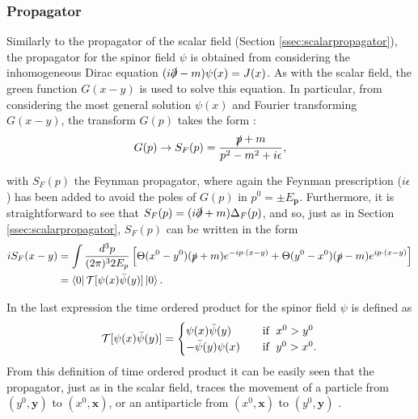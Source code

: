 \subsubsection{Propagator}

Similarly to the propagator of the scalar field (Section \ref{ssec:scalarpropagator}), the propagator for the spinor field $\psi$ is obtained from considering the inhomogeneous Dirac equation $(i\slashed{\partial} - m)\psi(x) = J(x)$. As with the scalar field, the green function $G(x - y)$ is used to solve this equation. In particular, from considering the most general solution $\psi(x)$ and Fourier transforming $G(x - y)$, the transform $G(p)$ takes the form \cite{Lahiri}:
\begin{equation*}
    G(p) \rightarrow S_F(p) = \dfrac{\slashed{p} + m}{p^2 - m^2 + i\epsilon},
\end{equation*}

with $S_F(p)$ the Feynman propagator, where again the Feynman prescription ($i\epsilon$) has been added to avoid the poles of $G(p)$ in $p^0=\pm E_{\bm{p}}$. Furthermore, it is straightforward to see that $S_F(p) = (i\slashed{\partial} + m)\Delta_F(p)$, and so, just as in Section \ref{ssec:scalarpropagator}, $S_F(p)$ can be written in the form
    \begin{align*}
    iS_F(x-y) &= \int \dfrac{d^3p}{(2\pi)^32E_p} \left[\Theta(x^0-y^0)(\slashed{p} + m)e^{-ip\cdot(x-y)} + \Theta(y^0-x^0)(\slashed{p} - m)e^{ip\cdot(x-y)}\right] \\
    &= \bra{0}\mathcal{T}[\psi(x)\Bar{\psi}(y)]\ket{0}.
\end{align*}

In the last expression the time ordered product for the spinor field $\psi$ is defined as
\[   
\mathcal{T}[\psi(x)\Bar{\psi}(y)] =
\begin{cases}
    \psi(x)\Bar{\psi}(y) \quad &\textrm{if}\;\ x^0 > y^0\\
    -\Bar{\psi}(y)\psi(x) \quad &\textrm{if}\;\ y^0 > x^0.
\end{cases} 
\]
From this definition of time ordered product it can be easily seen that the propagator, just as in the scalar field, traces the movement of a particle from $(y^0,\bm{y})$ to $(x^0,\bm{x})$, or an antiparticle from $(x^0,\bm{x})$ to $(y^0,\bm{y})$ \cite{Lahiri}.


